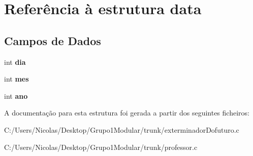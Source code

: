 \section{Referência à estrutura data}
\label{structdata}
\subsection*{Campos de Dados}
\begin{DoxyCompactItemize}
\item 
\mbox{\label{structdata_a3d1171ac670a8e8a672c481f22d1fa9f}} 
int {\bfseries dia}
\item 
\mbox{\label{structdata_a9fc86758220eae0e735655f81fd9d9bc}} 
int {\bfseries mes}
\item 
\mbox{\label{structdata_ac404d93cbf0169fd9e89edc17d0c5572}} 
int {\bfseries ano}
\end{DoxyCompactItemize}


A documentação para esta estrutura foi gerada a partir dos seguintes ficheiros\+:\begin{DoxyCompactItemize}
\item 
C\+:/\+Users/\+Nicolas/\+Desktop/\+Grupo1\+Modular/trunk/exterminador\+Dofuturo.\+c\item 
C\+:/\+Users/\+Nicolas/\+Desktop/\+Grupo1\+Modular/trunk/professor.\+c\end{DoxyCompactItemize}
